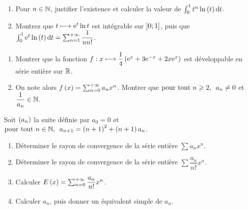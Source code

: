 \begin{exo}
\begin{enumerate}
    \item Pour \(n\in\mathbb{N}\), justifier l'existence et calculer la valeur de \(\int_0^1t^n\ln\paren{t}\odif{t}\). \\
    \item Montrez que \(t\longmapsto\mathrm{e}^{t}\ln t\) est intégrable sur \(\left]0;1\right]\), puis que \(\int_0^1\e{t}\ln\paren{t}\odif{t}=\sum_{n=1}^{\pinf}\dfrac{1}{nn!}\).
\end{enumerate}
\end{exo}

\begin{exo}
\begin{enumerate}
    \item Montrer que la fonction \(f:x\longmapsto\dfrac{1}{4}\left(\mathrm{e}^{x}+3\mathrm{e}^{-x}+2x\mathrm{e}^{x}\right)\) est développable en série entière sur \(\mathbb{R}\). \\
    \item On note alors \(f\left(x\right)=\sum_{n=0}^{+\infty}a_nx^n\). Montrer que \(\quantifs{\tpt n\geq2}a_n\not=0\) et \(\dfrac{1}{a_n}\in\mathbb{N}\).
\end{enumerate}
\end{exo}

\begin{exo}[Oral X, 19]
Soit \(\left(a_n\right)\) la suite définie par \(a_0=0\) et \(\quantifs{\tpt n\in\N}a_{n+1}=\paren{n+1}^2+\paren{n+1}a_n\).

\begin{enumerate}
    \item Déterminer le rayon de convergence de la série entière \(\sum a_nx^n\). \\
    \item Déterminer le rayon de convergence de la série entière \(\sum\dfrac{a_n}{n!}x^n\). \\
    \item Calculer \(E\left(x\right)=\sum_{n=0}^{+\infty}\dfrac{a_n}{n!}x^n\). \\
    \item Calculer \(a_n\), puis donner un équivalent simple de \(a_n\).
\end{enumerate}
\end{exo}
